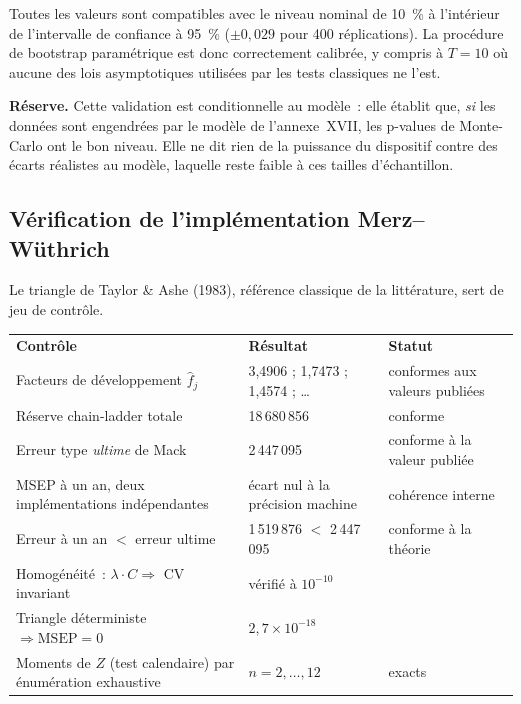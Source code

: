 \documentclass[a4paper,11pt]{article}
\begin{document}
Toutes les valeurs sont compatibles avec le niveau nominal de 10~\% à l'intérieur de
l'intervalle de confiance à 95~\% ($\pm 0{,}029$ pour 400 réplications). La procédure de
bootstrap paramétrique est donc correctement calibrée, y compris à $T = 10$ où aucune des lois
asymptotiques utilisées par les tests classiques ne l'est.

\medskip
\begin{encadre}
\textbf{Réserve.} Cette validation est conditionnelle au modèle~: elle établit que, \emph{si} les
données sont engendrées par le modèle de l'annexe~XVII, les p-values de Monte-Carlo ont le bon
niveau. Elle ne dit rien de la puissance du dispositif contre des écarts réalistes au modèle,
laquelle reste faible à ces tailles d'échantillon.
\end{encadre}

\newpage
\subsection{Vérification de l'implémentation Merz--Wüthrich}

Le triangle de Taylor \& Ashe (1983), référence classique de la littérature, sert
de jeu de contrôle.

\begin{center}
\small
{}
\begin{tabular}{@{}p{6.9cm}p{4.1cm}p{3.9cm}@{}}
\rowcolor{tableheader}
\textcolor{financeblue}{\textbf{Contrôle}} &
\textcolor{financeblue}{\textbf{Résultat}} &
\textcolor{financeblue}{\textbf{Statut}} \\
Facteurs de développement $\hat f_j$ & 3,4906 ; 1,7473 ; 1,4574 ; \dots &
conformes aux valeurs publiées \\
Réserve chain-ladder totale & 18\,680\,856 & conforme \\
Erreur type \emph{ultime} de Mack & 2\,447\,095 & conforme à la valeur publiée \\
MSEP à un an, deux implémentations indépendantes & écart nul à la précision
machine & cohérence interne \\
Erreur à un an $<$ erreur ultime & 1\,519\,876 $<$ 2\,447\,095 &
conforme à la théorie \\
Homogénéité~: $\lambda\!\cdot\!C \Rightarrow$ CV invariant & vérifié à
$10^{-10}$ & \\
Triangle déterministe $\Rightarrow \mathrm{MSEP} = 0$ &
$2{,}7\times10^{-18}$ & \\
Moments de $Z$ (test calendaire) par énumération exhaustive & $n = 2,\dots,12$ &
exacts \\
\end{tabular}
\end{center}
\end{document}
